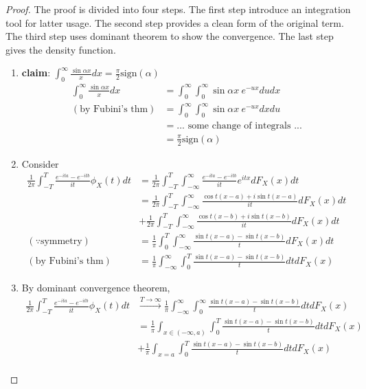 \documentclass[../Transformation.tex]{subfiles}
\begin{document}
\begin{proof}
	The proof is divided into four steps. The first step introduce an integration tool for latter usage. The second step provides a clean form of the original term. The third step uses dominant theorem to show the convergence. The last step gives the density function.
	\begin{enumerate}
		\item {\bf claim}: $\int_0^{\infty}\frac{\sin\alpha x}{x}dx = \frac{\pi}{2}\mbox{sign}(\alpha)$\\
		\begin{align*}
		\int_0^{\infty}\frac{\sin\alpha x}{x}dx &= \int_0^{\infty}\int_0^{\infty}\sin\alpha x\ e^{-ux}dudx\\
		(\mbox{by Fubini's thm})&=\int_0^{\infty}\int_0^{\infty}\sin\alpha x\ e^{-ux}dxdu\\
		&= ...\mbox{ some change of integrals }...\\
		&=\frac{\pi}{2}\mbox{sign}(\alpha)
		\end{align*}
		\item Consider
		\begin{align*}
		\frac{1}{2\pi}\int_{-T}^{T}\frac{e^{-ita}-e^{-itb}}{it}\phi_X(t)dt &= \frac{1}{2\pi}\int_{-T}^{T}\int_{-\infty}^{\infty}\frac{e^{-ita}-e^{-itb}}{it}e^{itx}dF_X(x)dt\\
		&=\frac{1}{2\pi}\int_{-T}^{T}\int_{-\infty}^{\infty}\frac{\cos t(x-a)+i\sin t(x-a)}{it}dF_X(x)dt\\
		&+\frac{1}{2\pi}\int_{-T}^{T}\int_{-\infty}^{\infty}\frac{\cos t(x-b)+i\sin t(x-b)}{it}dF_X(x)dt\\
		(\because\mbox{symmetry})&=\frac{1}{\pi}\int_0^{T}\int_{-\infty}^{\infty}\frac{\sin t(x-a) - \sin t(x-b)}{t}dF_X(x)dt\\
		(\mbox{by Fubini's thm})&=\frac{1}{\pi}\int_{-\infty}^{\infty}\int_0^{T}\frac{\sin t(x-a) - \sin t(x-b)}{t}dtdF_X(x)
		\end{align*}
		\item By dominant convergence theorem,
		\begin{align*}
		\frac{1}{2\pi}\int_{-T}^{T}\frac{e^{-ita}-e^{-itb}}{it}\phi_X(t)dt &\xrightarrow{T\rightarrow\infty}\frac{1}{\pi}\int_{-\infty}^{\infty}\int_0^{\infty}\frac{\sin t(x-a) - \sin t(x-b)}{t}dtdF_X(x)\\
		&=\frac{1}{\pi}\int_{x\in(-\infty,a)}\int_0^{T}\frac{\sin t(x-a) - \sin t(x-b)}{t}dtdF_X(x)\\
		&+\frac{1}{\pi}\int_{x=a}\int_0^{T}\frac{\sin t(x-a) - \sin t(x-b)}{t}dtdF_X(x)\\

\end{align*}
\end{enumerate}
\end{proof}
\end{document}
